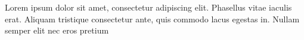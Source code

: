 \paginasiniciais


Lorem ipsum dolor sit amet, consectetur adipiscing elit. Phasellus vitae iaculis erat. Aliquam tristique consectetur ante, quis commodo lacus egestas in. Nullam semper elit nec eros pretium 


%




